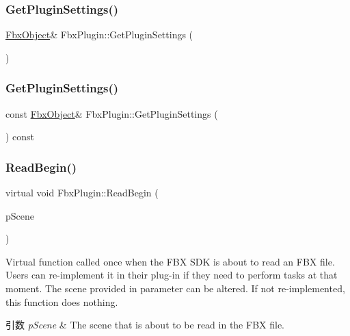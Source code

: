 \subsubsection{\texorpdfstring{Get\+Plugin\+Settings()}{GetPluginSettings()}\hspace{0.1cm}{\footnotesize\ttfamily [1/2]}}
{\footnotesize\ttfamily \hyperlink{class_fbx_object}{Fbx\+Object}\& Fbx\+Plugin\+::\+Get\+Plugin\+Settings (\begin{DoxyParamCaption}{ }\end{DoxyParamCaption})}

\mbox{\label{class_fbx_plugin_a3f5e6d9e20e306ceee8f163bbf59fe58}} 
\subsubsection{\texorpdfstring{Get\+Plugin\+Settings()}{GetPluginSettings()}\hspace{0.1cm}{\footnotesize\ttfamily [2/2]}}
{\footnotesize\ttfamily const \hyperlink{class_fbx_object}{Fbx\+Object}\& Fbx\+Plugin\+::\+Get\+Plugin\+Settings (\begin{DoxyParamCaption}{ }\end{DoxyParamCaption}) const}

\mbox{\label{class_fbx_plugin_ac39bc91afc422603d99fea3c09700814}} 
\subsubsection{\texorpdfstring{Read\+Begin()}{ReadBegin()}}
{\footnotesize\ttfamily virtual void Fbx\+Plugin\+::\+Read\+Begin (\begin{DoxyParamCaption}\item[{\hyperlink{class_fbx_scene}{Fbx\+Scene} \&}]{p\+Scene }\end{DoxyParamCaption})\hspace{0.3cm}{\ttfamily [virtual]}}

Virtual function called once when the F\+BX S\+DK is about to read an F\+BX file. Users can re-\/implement it in their plug-\/in if they need to perform tasks at that moment. The scene provided in parameter can be altered. If not re-\/implemented, this function does nothing. 
\begin{DoxyParams}{引数}
{\em p\+Scene} & The scene that is about to be read in the F\+BX file. \\
\hline
\end{DoxyParams}
\mbox{\label{class_fbx_plugin_a89290eef23c5359db142e0ad1d8743e0}} 
